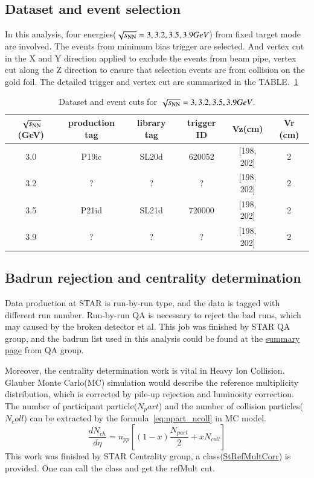 \subsection{Dataset and event selection}

In this analysis, four energies($\sqrt{s_\text{NN}}=3, 3.2, 3.5, 3.9 GeV$) from fixed target mode are involved.
The events from minimum bias trigger are selected. And vertex cut in the X and Y direction applied to exclude the events from beam pipe, 
vertex cut along the Z direction to ensure that selection events are from collision on the gold foil.
The detailed trigger and vertex cut are summarized in the TABLE.~\ref{tab:dataset}
\begin{table}
\caption{Dataset and event cuts for $\sqrt{s_\text{NN}}=3, 3.2, 3.5, 3.9 GeV$.}
\label{tab:dataset}
\begin{tabular}{|c|c|c|c|c|c|}
\hline
$\sqrt{s_\text{NN}}$(GeV) & production tag & library tag & trigger ID & Vz(cm)     & Vr (cm) \\ \hline
3.0         & P19ic          & SL20d       & 620052     & [198, 202] & 2       \\ \hline
3.2         & ?          & ?       & ?     & [198, 202] & 2       \\ \hline
3.5         & P21id          & SL21d       & 720000     & [198, 202] & 2       \\ \hline
3.9         & ?          & ?       & ?     & [198, 202] & 2       \\ \hline
\end{tabular}
\end{table}


\subsection{Badrun rejection and centrality determination}

Data production at STAR is run-by-run type, and the data is tagged with different run number.
Run-by-run QA is necessary to reject the bad runs, which may caused by the broken detector et al.
This job was finished by STAR QA group, and the badrun list used in this analysis could be found at the
\href{https://drupal.star.bnl.gov/STAR/pwg/common/bes-ii-run-qa/FXT-datasets}{summary page} from QA group.

Moreover, the centrality determination work is vital in Heavy Ion Collision.
Glauber Monte Carlo(MC) simulation\cite{KHARZEEV2001121} would describe the reference multiplicity distribution, 
which is corrected by pile-up rejection and luminosity correction.
The number of participant particle($N_part$) and the number of collision particles($N_coll$)
 can be extracted by the formula~\ref{eq:npart_ncoll} in MC model.
 \begin{equation}
    \frac{d N_{c h}}{d \eta}=n_{p p}\left[(1-x) \frac{N_{p a r t}}{2}+x N_{c o l l}\right]
\label{eq:npart_ncoll}
\end{equation}
This work was finished by STAR Centrality group, a class(\href{https://github.com/star-bnl/star-sw/tree/main/StRoot/StRefMultCorr}{StRefMultCorr}) is provided.
One can call the class and get the refMult cut.

